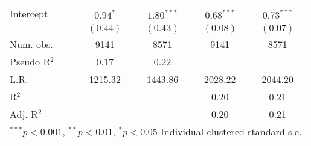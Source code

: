 \begin{table}
\begin{center}
\begin{tabular}{l c c c c }
Intercept       & $0.94^{*}$    & $1.80^{***}$  & $0.68^{***}$  & $0.73^{***}$  \\
                & $(0.44)$      & $(0.43)$      & $(0.08)$      & $(0.07)$      \\
\hline
Num. obs.       & 9141          & 8571          & 9141          & 8571          \\
Pseudo R$^2$    & 0.17          & 0.22          &               &               \\
L.R.            & 1215.32       & 1443.86       & 2028.22       & 2044.20       \\
R$^2$           &               &               & 0.20          & 0.21          \\
Adj. R$^2$      &               &               & 0.20          & 0.21          \\
\hline
\multicolumn{5}{l}{\scriptsize{$^{***}p<0.001$, $^{**}p<0.01$, $^*p<0.05$ Individual clustered standard s.e.}}
\end{tabular}
\label{table:gender_spe_models}
\end{center}
\end{table}
